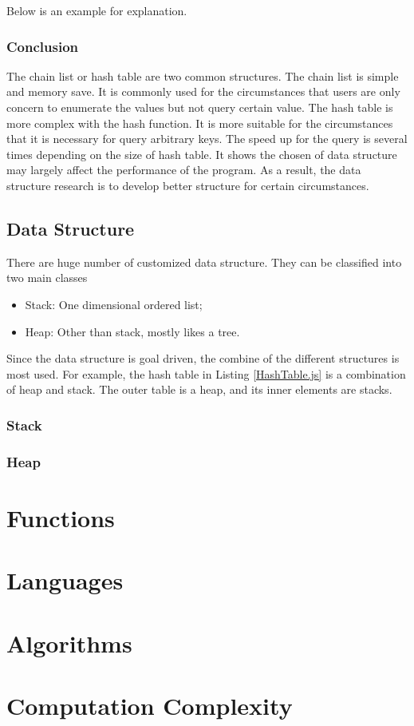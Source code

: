 Below is an example for explanation.



\subsubsection{Conclusion}

The chain list or hash table are two common structures.
The chain list is simple and memory save.
It is commonly used for the circumstances that users are only concern to enumerate the values but not query certain value.
The hash table is more complex with the hash function.
It is more suitable for the circumstances that it is necessary for query arbitrary keys.
The speed up for the query is several times depending on the size of hash table.
It shows the chosen of data structure may largely affect the performance of the program.
As a result, the data structure research is to develop better structure for certain circumstances.

\subsection{Data Structure}

There are huge number of customized data structure.
They can be classified into two main classes
\begin{itemize}
    \item Stack: One dimensional ordered list;
    \item Heap: Other than stack, mostly likes a tree.
\end{itemize}
Since the data structure is goal driven, the combine of the different structures is most used.
For example, the hash table in Listing \ref{HashTable.js} is a combination of heap and stack.
The outer table is a heap, and its inner elements are stacks.

\subsubsection{Stack}

\subsubsection{Heap}

\section{Functions}

\section{Languages}

\section{Algorithms}

\appendix

\section{Computation Complexity}


